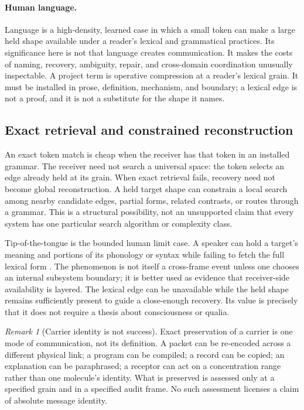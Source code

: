 \documentclass[11pt,a4paper]{article}
\theoremstyle{remark}\newtheorem{remark}[definition]{Remark}
\begin{document}
\paragraph{Human language.} Language is a high-density, learned case in which a
small token can make a large held shape available under a reader's lexical and
grammatical practices. Its significance here is not that language creates
communication. It makes the costs of naming, recovery, ambiguity, repair, and
cross-domain coordination unusually inspectable. A project term is operative
compression at a reader's lexical grain. It must be installed in prose,
definition, mechanism, and boundary; a lexical edge is not a proof, and it is not
a substitute for the shape it names.

\subsection{Exact retrieval and constrained reconstruction}\label{sec:retrieval}

An exact token match is cheap when the receiver has that token in an installed
grammar. The receiver need not search a universal space: the token selects an
edge already held at its grain. When exact retrieval fails, recovery need not
become global reconstruction. A held target shape can constrain a local search
among nearby candidate edges, partial forms, related contrasts, or routes through
a grammar. This is a structural possibility, not an unsupported claim that every
system has one particular search algorithm or complexity class.

Tip-of-the-tongue is the bounded human limit case. A speaker can hold a target's
meaning and portions of its phonology or syntax while failing to fetch the full
lexical form \citep{brownmcneill1966,levelt1999}. The phenomenon is not itself a
cross-frame event unless one chooses an internal subsystem boundary; it is better
used as evidence that receiver-side availability is layered. The lexical edge can
be unavailable while the held shape remains sufficiently present to guide a
close-enough recovery. Its value is precisely that it does not require a thesis
about consciousness or qualia.

\begin{remark}[Carrier identity is not success]\label{rem:identity}
Exact preservation of a carrier is one mode of communication, not its definition.
A packet can be re-encoded across a different physical link; a program can be
compiled; a record can be copied; an explanation can be paraphrased; a receptor
can act on a concentration range rather than one molecule's identity. What is
preserved is assessed only at a specified grain and in a specified audit frame.
No such assessment licenses a claim of absolute message identity.
\end{remark}
\end{document}
